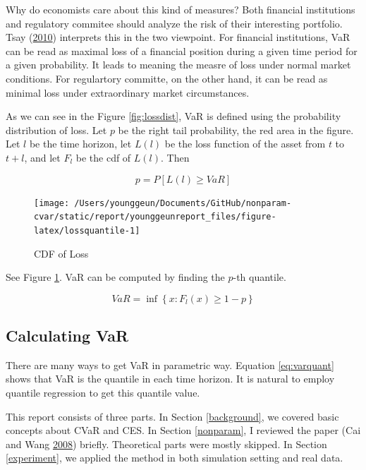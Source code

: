 \documentclass[
]{article}
\theoremstyle{definition}
\theoremstyle{definition}
\theoremstyle{definition}
\theoremstyle{remark}
\begin{document}
Why do economists care about this kind of measures? Both financial institutions and regulatory commitee should analyze the risk of their interesting portfolio. Tsay (\protect\hyperlink{ref-Tsay:2010aa}{2010}) interprets this in the two viewpoint. For financial institutions, VaR can be read as maximal loss of a financial position during a given time period for a given probability. It leads to meaning the measre of loss under normal market conditions. For regulartory committe, on the other hand, it can be read as minimal loss under extraordinary market circumstances.

As we can see in the Figure \ref{fig:lossdist}, VaR is defined using the probability distribution of loss. Let \(p\) be the right tail probability, the red area in the figure. Let \(l\) be the time horizon, let \(L(l)\) be the loss function of the asset from \(t\) to \(t + l\), and let \(F_l\) be the cdf of \(L(l)\). Then

\begin{equation}
  p = P \left[ L(l) \ge VaR \right]
  \label{eq:vardef}
\end{equation}

\begin{figure}[H]

{\centering \texttt{[image: /Users/younggeun/Documents/GitHub/nonparam-cvar/static/report/younggeunreport\_files/figure-latex/lossquantile-1]} 

}

\caption{CDF of Loss}\label{fig:lossquantile}
\end{figure}

See Figure \ref{fig:lossquantile}. VaR can be computed by finding the \(p\)-th quantile.

\begin{equation}
  VaR = \inf \left\{ x \mathpunct{:} F_l(x) \ge 1 - p \right\}
  \label{eq:varquant}
\end{equation}

\hypertarget{calculating-var}{%
\subsection{Calculating VaR}\label{calculating-var}}

There are many ways to get VaR in parametric way. Equation \eqref{eq:varquant} shows that VaR is the quantile in each time horizon. It is natural to employ quantile regression to get this quantile value.

This report consists of three parts. In Section \ref{background}, we covered basic concepts about CVaR and CES. In Section \ref{nonparam}, I reviewed the paper (Cai and Wang \protect\hyperlink{ref-cai:2008aa}{2008}) briefly. Theoretical parts were mostly skipped. In Section \ref{experiment}, we applied the method in both simulation setting and real data.
\end{document}
